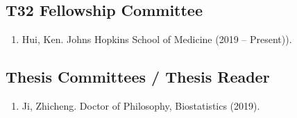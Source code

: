 \documentclass[10pt]{article}
\newcommand{\dn}[1]{{\color{black} {#1}}}
\newcommand{\myben}[1]{\smallskip\begin{enumerate}[start=1,label={\scriptsize \arabic*$\ $},leftmargin=\parindent]\setlength{\itemsep}{#1}\vspace*{-0.7em}}
\newcommand{\ee}{\end{enumerate}}
\newcommand{\mylift}[1]{\vspace*{#1}}
\begin{document}






\mylift{-1.5em}

\subsection*{T32 Fellowship Committee}

\myben{-0.1em}

\item Hui, Ken. Johns Hopkins School of Medicine (2019 -- Present)).

\ee

\mylift{-1.5em}

\subsection*{Thesis Committees / Thesis Reader}

\myben{-0.1em}

\item \dn{Ji}, Zhicheng. Doctor of Philosophy, Biostatistics (2019).

\ee






\end{document}
